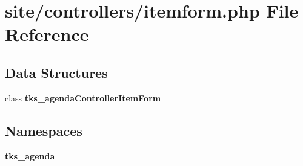 \section{site/controllers/itemform.php File Reference}
\label{controllers_2itemform_8php}
\subsection*{Data Structures}
\begin{DoxyCompactItemize}
\item 
class \textbf{ tks\+\_\+agenda\+Controller\+Item\+Form}
\end{DoxyCompactItemize}
\subsection*{Namespaces}
\begin{DoxyCompactItemize}
\item 
 \textbf{ tks\+\_\+agenda}
\end{DoxyCompactItemize}
